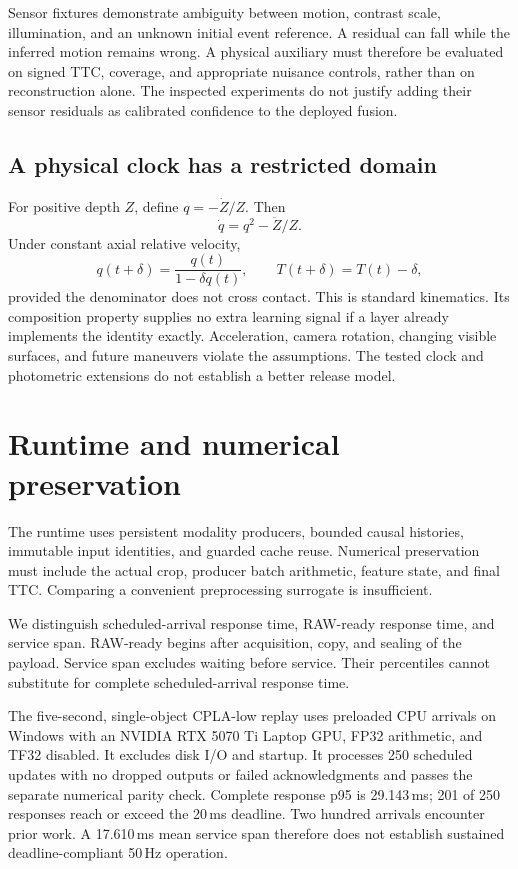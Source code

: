 \documentclass[twocolumn,letterpaper]{article}
\begin{document}
Sensor fixtures demonstrate ambiguity between motion, contrast scale, illumination, and an unknown initial event reference. A residual can fall while the inferred motion remains wrong. A physical auxiliary must therefore be evaluated on signed TTC, coverage, and appropriate nuisance controls, rather than on reconstruction alone. The inspected experiments do not justify adding their sensor residuals as calibrated confidence to the deployed fusion.

\subsection{A physical clock has a restricted domain}
For positive depth $Z$, define $q=-\dot Z/Z$. Then
\begin{equation}
 \dot q=q^2-\ddot Z/Z.
\end{equation}
Under constant axial relative velocity,
\begin{equation}
 q(t+\delta)=\frac{q(t)}{1-\delta q(t)},\qquad
 T(t+\delta)=T(t)-\delta,
\label{eq:clock}
\end{equation}
provided the denominator does not cross contact. This is standard kinematics. Its composition property supplies no extra learning signal if a layer already implements the identity exactly. Acceleration, camera rotation, changing visible surfaces, and future maneuvers violate the assumptions. The tested clock and photometric extensions do not establish a better release model.

\section{Runtime and numerical preservation}
\label{sec:runtime}
The runtime uses persistent modality producers, bounded causal histories, immutable input identities, and guarded cache reuse. Numerical preservation must include the actual crop, producer batch arithmetic, feature state, and final TTC. Comparing a convenient preprocessing surrogate is insufficient.

We distinguish scheduled-arrival response time, RAW-ready response time, and service span. RAW-ready begins after acquisition, copy, and sealing of the payload. Service span excludes waiting before service. Their percentiles cannot substitute for complete scheduled-arrival response time.


The five-second, single-object CPLA-low replay uses preloaded CPU arrivals on Windows with an NVIDIA RTX 5070 Ti Laptop GPU, FP32 arithmetic, and TF32 disabled. It excludes disk I/O and startup. It processes 250 scheduled updates with no dropped outputs or failed acknowledgments and passes the separate numerical parity check. Complete response p95 is 29.143\,ms; 201 of 250 responses reach or exceed the 20\,ms deadline. Two hundred arrivals encounter prior work. A 17.610\,ms mean service span therefore does not establish sustained deadline-compliant 50\,Hz operation.
\end{document}
